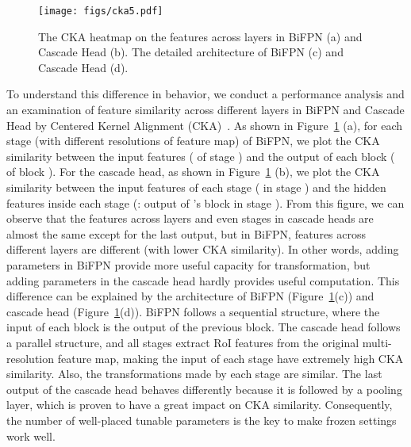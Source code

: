 \documentclass{article}
\begin{document}
\begin{figure}[h]
    \centering
    \texttt{[image: figs/cka5.pdf]}
    \caption{The CKA heatmap on the features across layers in BiFPN (a) and Cascade Head (b). The detailed architecture of BiFPN (c) and Cascade Head (d).}
    \label{fig:cka}
\end{figure}

To understand this difference in behavior, we conduct a performance analysis and an examination of feature similarity across different layers in BiFPN and Cascade Head by Centered Kernel Alignment (CKA)~\cite{cka}.
As shown in Figure~\ref{fig:cka} (a), for each stage (with different resolutions of feature map) of BiFPN, we plot the CKA similarity between the input features ( of stage ) and the output of each block ( of block ).
For the cascade head, as shown in Figure~\ref{fig:cka} (b), we plot the CKA similarity between the input features of each stage ( in stage ) and the hidden features inside each stage (: output of 's block in stage ).
From this figure, we can observe that the features across layers and even stages in cascade heads are almost the same except for the last output, but in BiFPN, features across different layers are different (with lower CKA similarity). In other words, adding parameters in BiFPN provide more useful capacity for transformation, but adding parameters in the cascade head hardly provides useful computation. 
This difference can be explained by the architecture of BiFPN (Figure~\ref{fig:cka}(c)) and cascade head (Figure~\ref{fig:cka}(d)). BiFPN follows a sequential structure, where the input of each block is the output of the previous block. The cascade head follows a parallel structure, and all stages extract RoI features from the original multi-resolution feature map, making the input of each stage have extremely high CKA similarity. Also, the transformations made by each stage are similar.
The last output of the cascade head behaves differently because it is followed by a pooling layer, which is proven to have a great impact on CKA similarity. Consequently, the number of well-placed tunable parameters is the key to make frozen settings work well.
\end{document}
